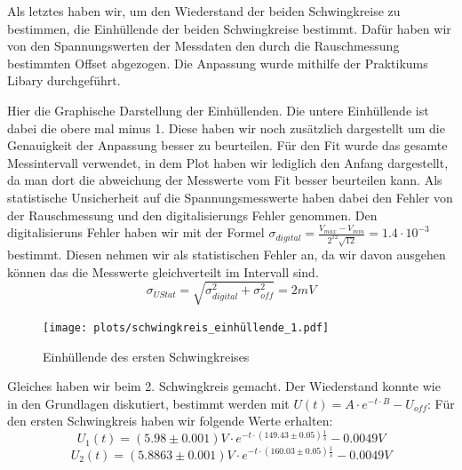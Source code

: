 \documentclass[twoside]{protokoll}
\begin{document}
Als letztes haben wir, um den Wiederstand der beiden Schwingkreise zu bestimmen, die Einhüllende der beiden Schwingkreise bestimmt.
Dafür haben wir von den Spannungswerten der Messdaten den durch die Rauschmessung bestimmten Offset abgezogen.
Die Anpassung wurde mithilfe der Praktikums Libary durchgeführt.
 
Hier die Graphische Darstellung der Einhüllenden.
Die untere Einhüllende ist dabei die obere mal minus 1.
Diese haben wir noch zusätzlich dargestellt um die Genauigkeit der Anpassung besser zu beurteilen.
Für den Fit wurde das gesamte Messintervall verwendet, in dem Plot haben wir lediglich den Anfang dargestellt, da man dort die abweichung der Messwerte vom Fit besser beurteilen kann.
Als statistische Unsicherheit auf die Spannungsmesswerte haben dabei den Fehler von der Rauschmessung und den digitalisierungs Fehler genommen.
Den digitalisieruns Fehler haben wir mit der Formel $ \sigma_{digital} = \frac{V_{max} - V_{min}}{2^{12} \sqrt{12}} = 1.4 \cdot 10^{-3}$ bestimmt.
Diesen nehmen wir als statistischen Fehler an, da wir davon ausgehen können das die Messwerte gleichverteilt im Intervall sind.
\begin{equation}
    \sigma_{U Stat} = \sqrt{ \sigma_{digital}^2 +  \sigma_{off}^2} = 2mV
\end{equation}
\begin{figure}[H]
    \centering
    \texttt{[image: plots/schwingkreis\_einhüllende\_1.pdf]}
    \caption{Einhüllende des ersten Schwingkreises}
\end{figure}

Gleiches haben wir beim 2. Schwingkreis gemacht.
Der Wiederstand konnte wie in den Grundlagen diskutiert, bestimmt werden mit $ U(t) = A \cdot e^{-t \cdot B} - U_{off}$:
Für den ersten Schwingkreis haben wir folgende Werte erhalten:
\begin{equation}
    U_1(t) = (5.98 \pm 0.001)V \cdot e^{-t \cdot (149.43 \pm 0.05) \frac{1}{s} } - 0.0049 V
\end{equation}
\begin{equation}
    U_2(t) = (5.8863 \pm 0.001)V \cdot e^{-t \cdot (160.03 \pm 0.05) \frac{1}{s} } - 0.0049 V
\end{equation}
\end{document}
